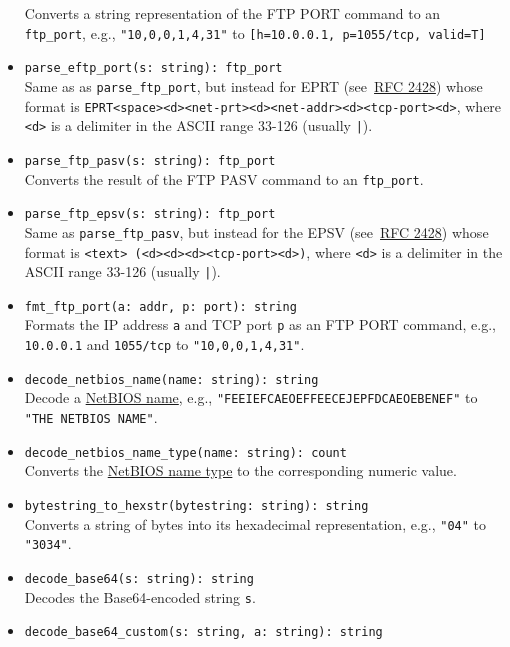\documentclass[10pt,landscape]{article}
\begin{document}
\begin{multicols*}{2}
\begin{itemize}
    Converts a string representation of the FTP PORT command to an
    \verb|ftp_port|,
    e.g., \verb|"10,0,0,1,4,31"| to \verb|[h=10.0.0.1, p=1055/tcp, valid=T]|
  \item \verb|parse_eftp_port(s: string): ftp_port|\\
    Same as as \verb|parse_ftp_port|, but instead for EPRT
    (see~\href{http://tools.ietf.org/html/rfc2428}{RFC 2428}) whose format is
    \verb|EPRT<space><d><net-prt><d><net-addr><d><tcp-port><d>|, where
    \verb|<d>| is a delimiter in the ASCII range 33-126 (usually \verb#|#).
  \item \verb|parse_ftp_pasv(s: string): ftp_port|\\
    Converts the result of the FTP PASV command to an \verb|ftp_port|.
  \item \verb|parse_ftp_epsv(s: string): ftp_port|\\
    Same as \verb|parse_ftp_pasv|, but instead for the EPSV
    (see~\href{http://tools.ietf.org/html/rfc2428}{RFC 2428}) whose format is
    \verb|<text> (<d><d><d><tcp-port><d>)|, where \verb|<d>| is a delimiter in
    the ASCII range 33-126 (usually \verb#|#).
  \item \verb|fmt_ftp_port(a: addr, p: port): string|\\
    Formats the IP address \texttt{a} and TCP port \texttt{p} as an FTP
    PORT command, e.g., \verb|10.0.0.1| and \verb|1055/tcp| to
    \verb|"10,0,0,1,4,31"|.
  \item \verb|decode_netbios_name(name: string): string|\\
    Decode a \href{http://support.microsoft.com/kb/194203}{NetBIOS name}, e.g.,
    \verb|"FEEIEFCAEOEFFEECEJEPFDCAEOEBENEF"| to \verb|"THE NETBIOS NAME"|.
  \item \verb|decode_netbios_name_type(name: string): count|\\
    Converts the \href{http://support.microsoft.com/kb/163409}{NetBIOS name
    type} to the corresponding numeric value.
  \item \verb|bytestring_to_hexstr(bytestring: string): string|\\
    Converts a string of bytes into its hexadecimal representation, e.g.,
    \verb|"04"| to \verb|"3034"|.
  \item \verb|decode_base64(s: string): string|\\
    Decodes the Base64-encoded string \verb|s|.
  \item \verb|decode_base64_custom(s: string, a: string): string|\\

\end{itemize}
\end{multicols*}
\end{document}

